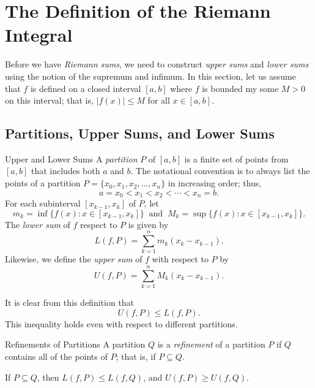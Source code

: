 \section{The Definition of the Riemann Integral}

Before we have \textit{Riemann sums}, we need to construct \textit{upper sums}  and \textit{lower sums} using the notion of the supremum and infimum. In this section, let us assume that \( f  \) is defined on a closed interval \( [a,b]  \) where \( f  \) is bounded my some \( M > 0  \) on this interval; that is, \( | f(x)  | \leq M  \) for all \( x \in [a,b] \). 

\subsection{Partitions, Upper Sums, and Lower Sums}

\begin{definition}{Upper and Lower Sums}{}
	A \textit{partition} \( P  \) of \( [a,b]  \) is a finite set of points from \( [a,b]  \) that includes both \( a  \) and \( b  \). The notational convention is to always list the points of a partition \( P = \{ x_{0}, x_{1}, x_{2}, \dots, x_{n} \}  \) in increasing order; thus, \[  a = x_{0} < x_{1} < x_{2} < \dotsb < x_{n} = b. \]
	For each subinterval \( [x_{k-1}, x_{k} ] \) of \( P  \), let 
	\[  m_{k } = \inf \{ f(x) : x \in [x_{k-1} , x_{k } ] \} \ \text{ and } \  M_{k } = \sup \{ f(x) : x \in [x_{k-1}, x_{k }] \}. \]
	The \textit{lower sum} of \( f  \) respect to \( P  \) is given by 
	\[  L(f, P ) = \sum_{ k=1 }^{ n } m_{ k } ( x_{k } -  x_{ k -1 }). \]
	Likewise, we define the \textit{upper sum} of \( f  \) with respect to \( P  \) by 
	\[  U(f, P ) = \sum_{ k=1 }^{ n } M_k ( x_{k } - x_{ k -1 }). \]
\end{definition}

It is clear from this definition that 
\[  U(f, P ) \leq L(f, P ).\]  This inequality holds even with respect to different partitions.

\begin{definition}{Refinements of Partitions}{}
A partition \( Q  \) is a \textit{refinement} of a partition \( P  \) if \( Q  \) contains all of the points of \( P  \); that is, if \( P \subseteq Q  \).



\end{definition}

\begin{lemma}
If \( P \subseteq Q  \), then \( L(f,P) \leq L(f,Q)  \), and \( U(f,P ) \geq U(f,Q) \).
\end{lemma}

